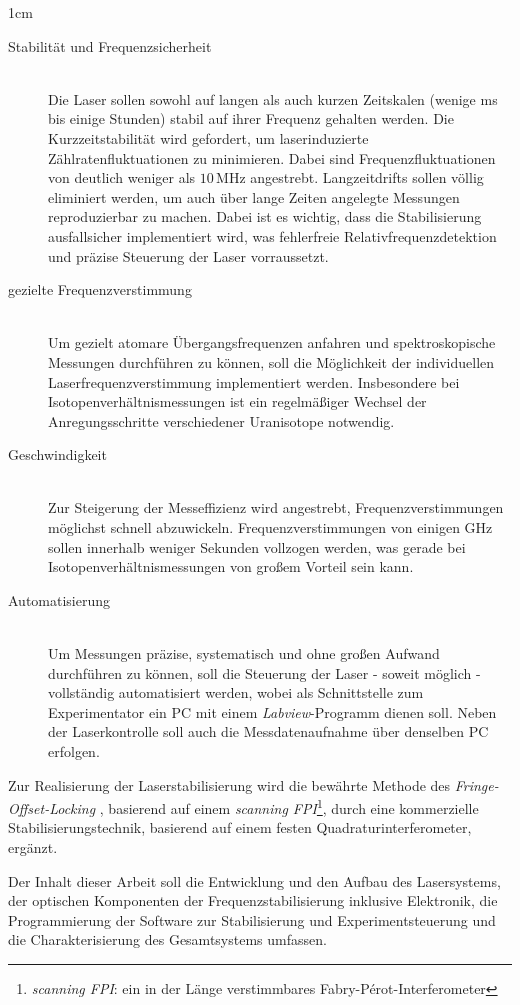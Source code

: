 \begin{setlength}{\leftmargini}{1cm}
	\begin{description}
		\item[Stabilität und Frequenzsicherheit]\hfill\\
			Die Laser sollen sowohl auf langen als auch kurzen Zeitskalen (wenige ms bis
			einige Stunden) stabil auf ihrer Frequenz gehalten werden. Die
			Kurzzeitstabilität wird gefordert, um laserinduzierte Zählratenfluktuationen
			zu minimieren. Dabei sind Frequenzfluktuationen von deutlich weniger als
			$10\,$MHz angestrebt. Langzeitdrifts sollen völlig eliminiert werden, um auch
			über lange Zeiten angelegte Messungen reproduzierbar zu machen. Dabei ist es
			wichtig, dass die Stabilisierung ausfallsicher implementiert wird, was
			fehlerfreie Relativfrequenzdetektion und präzise Steuerung der Laser
			vorraussetzt.
		\item[gezielte Frequenzverstimmung]\hfill\\
			Um gezielt atomare Übergangsfrequenzen anfahren und spektroskopische
			Messungen durchführen zu können, soll die Möglichkeit der individuellen
			Laserfrequenzverstimmung implementiert werden. Insbesondere bei
			Isotopenverhältnismessungen ist ein regelmäßiger Wechsel der
			Anregungsschritte verschiedener Uranisotope notwendig.
		\item[Geschwindigkeit]\hfill\\
			Zur Steigerung der Messeffizienz wird angestrebt, Frequenzverstimmungen
			möglichst schnell abzuwickeln. Frequenzverstimmungen von einigen
			GHz sollen innerhalb weniger Sekunden vollzogen werden, was gerade bei
			Isotopenverhältnismessungen von großem Vorteil sein kann.
		\item[Automatisierung]\hfill\\
			Um Messungen präzise, systematisch und ohne großen Aufwand durchführen zu
			können, soll die Steuerung der Laser - soweit möglich - vollständig
			automatisiert werden, wobei als Schnittstelle zum Experimentator ein PC mit
			einem \textit{Labview}-Programm dienen soll. Neben der Laserkontrolle soll
			auch die Messdatenaufnahme über denselben PC erfolgen.
	\end{description}
\end{setlength} 
Zur Realisierung der Laserstabilisierung wird die bewährte Methode des
\textit{Fringe-Offset-Locking} \cite{kuschnick:2000:diplomarbeit}, basierend auf
einem \textit{scanning FPI}\footnote{\textit{scanning FPI}: ein in der Länge
verstimmbares Fabry-Pérot-Interferometer}, durch eine kommerzielle
Stabilisierungstechnik, basierend auf einem festen Quadraturinterferometer,
ergänzt.\par
Der Inhalt dieser Arbeit soll die Entwicklung und den Aufbau des Lasersystems,
der optischen Komponenten der Frequenzstabilisierung inklusive Elektronik, die
Programmierung der Software zur Stabilisierung und Experimentsteuerung und die
Charakterisierung des Gesamtsystems umfassen.
